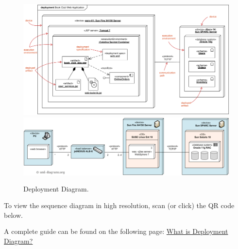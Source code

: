 \begin{figure}[!htp]
    \centering
    \includegraphics[width=\textwidth]{img/deployment-diagram.png}
    \includegraphics[width=\textwidth]{img/deployment-diagram-2.png}
    \caption{Deployment Diagram.}
\end{figure}

\noindent
To view the sequence diagram in high resolution, scan (or click) the QR code below.
\begin{center}
    \hspace{2em}
\end{center}
A complete guide can be found on the following page: \href{https://www.visual-paradigm.com/guide/uml-unified-modeling-language/what-is-deployment-diagram/}{What is Deployment Diagram?
}